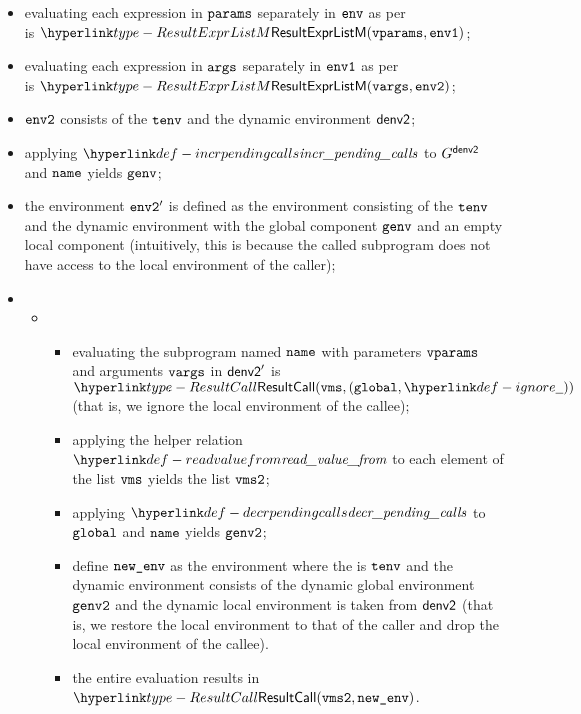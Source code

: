 \ProseParagraph
\AllApply
\begin{itemize}
  \item evaluating each expression in $\texttt{params}$ separately in $\texttt{env}$ as per\\
         is $\ResultExprListM(\vvparams, \envone)$\ProseOrAbnormal;
  \item evaluating each expression in $\texttt{args}$ separately in $\texttt{env1}$ as per \\
         is $\ResultExprListM(\vvargs, \envtwo)$\ProseOrAbnormal;
  \item $\texttt{env2}$ consists of the \staticenvironmentterm{} $\texttt{tenv}$ and the dynamic environment $\textsf{denv2}$;
  \item applying $\incrpendingcalls$ to $G^{\textsf{denv2}}$ and $\texttt{name}$ yields $\texttt{genv}$;
  \item the environment $\texttt{env2}'$ is defined as the environment
  consisting of the \staticenvironmentterm{} $\texttt{tenv}$ and the dynamic environment with the global component
  $\texttt{genv}$ and an empty local component (intuitively, this is because the called subprogram does not have access
  to the local environment of the caller);
  \item \OneApplies
  \begin{itemize}
    \item {}
    \begin{itemize}
      \item evaluating the subprogram named $\texttt{name}$ with parameters $\texttt{vparams}$ and arguments $\texttt{vargs}$ in
            $\textsf{denv2}'$ is $\ResultCall(\vms, (\vglobal, \Ignore))$ (that is, we ignore the local environment
            of the callee)\ProseOrDynErrorDiverging;
      \item applying the helper relation $\readvaluefrom$ to each element of the list $\texttt{vms}$ yields the list $\texttt{vms2}$;
      \item applying $\decrpendingcalls$ to $\texttt{global}$ and $\texttt{name}$ yields $\texttt{genv2}$;
      \item define $\texttt{new\_env}$ as the environment where the \staticenvironmentterm{} is $\texttt{tenv}$ and the dynamic environment consists
            of the dynamic global environment $\texttt{genv2}$ and the dynamic local environment is taken from $\textsf{denv2}$
            (that is, we restore the local environment to that of the caller and drop the local environment of the callee).
      \item the entire evaluation results in $\ResultCall(\vmstwo, \newenv)$.
    \end{itemize}


\end{itemize}
\end{itemize}
